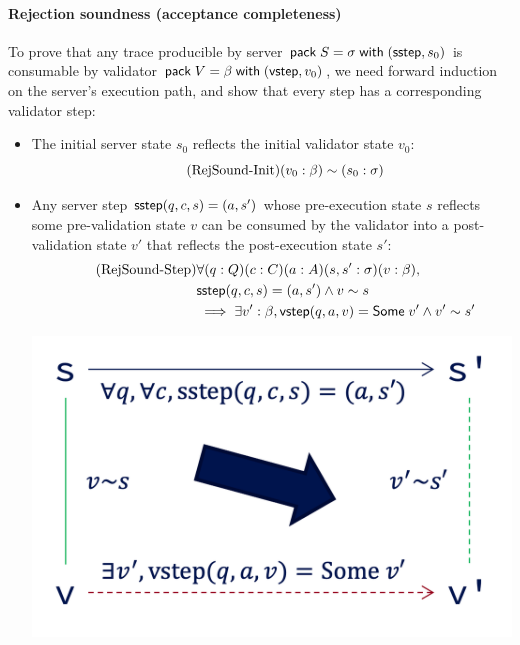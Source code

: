 \paragraph{Rejection soundness (acceptance completeness)}
To prove that any trace producible by server $\mathsf{pack}\;S=\sigma\;\mathsf{with}\;(\mathsf{sstep},s_0)$
is consumable by validator $\mathsf{pack}\;V=\beta\;\mathsf{with}\;(\mathsf{vstep},v_0)$, we need forward
induction on the server's execution path, and show that every step has a
corresponding validator step:
\begin{itemize}
\item The initial server state $s_0$ reflects the initial validator state $v_0$:
  \begin{equation}
    \tag{RejSound-Init}
    \label{eq:rs1}
    (v_0:\beta)\sim (s_0:\sigma)
  \end{equation}
\item Any server step $\mathsf{sstep}(q,c,s)=(a,s')$ whose pre-execution state $s$
  reflects some pre-validation state $v$ can be consumed by the validator
  into a post-validation state $v'$ that reflects the post-execution state $s'$:
  \begin{align*}
    \tag{RejSound-Step}
    \label{eq:rs2}
    &\forall(q:Q)(c:C)(a:A)(s,s':\sigma)(v:\beta),\\
    &\mathsf{sstep}(q,c,s)=(a,s')\wedge v\sim s\\
    &\implies\exists v':\beta,\mathsf{vstep}(q,a,v)=\mathsf{Some}\;v'\wedge v'\sim s'
  \end{align*}
  \begin{center}
    \includegraphics[width=.5\textwidth]{figures/sound}
  \end{center}
\end{itemize}

